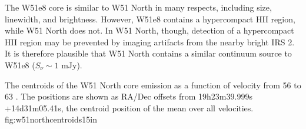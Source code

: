 The W51e8 core is similar to W51 North in many respects, including size,
linewidth, and brightness.  However, W51e8 contains a hypercompact HII region,
while W51 North does not.  In W51 North, though, detection of a hypercompact
HII region may be prevented by imaging artifacts from the nearby bright IRS 2.
It is therefore plausible that W51 North contains a similar continuum source to
W51e8 ($S_\nu \sim 1$ mJy).


{The centroids of the W51 North core \ortho \twotwo emission as a function of 
velocity from 56 to 63 \kms.  The positions are shown as RA/Dec offsets from
19h23m39.999s +14d31m05.41s, the centroid position of the mean over all
velocities.}
{fig:w51northcentroids}{1}{5in}

